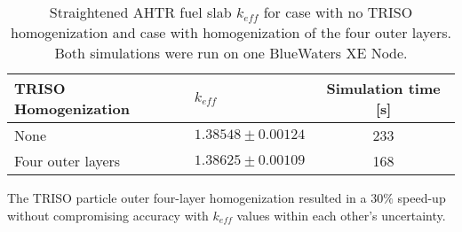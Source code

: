 \begin{table}[H]
    \centering
    \onehalfspacing
    \caption{Straightened \acrfull{AHTR} fuel slab $k_{eff}$ for case with 
    no \gls{TRISO} homogenization and case with homogenization of the four outer 
    layers. Both simulations were run on one BlueWaters XE Node.}
	\label{tab:keff_triso}
    \footnotesize
    \begin{tabular}{llc}
    \hline 
    \textbf{TRISO Homogenization}& \textbf{$k_{eff}$} & \textbf{Simulation time [s]}  \\
    \hline 
    None & $1.38548 \pm 0.00124$ & 233\\ 
    Four outer layers & $1.38625 \pm 0.00109$ & 168\\ 
    \hline
    \end{tabular}
\end{table}
The \gls{TRISO} particle outer four-layer homogenization resulted in a $30\%$ 
speed-up without compromising accuracy with $k_{eff}$ values within each 
other's uncertainty.


